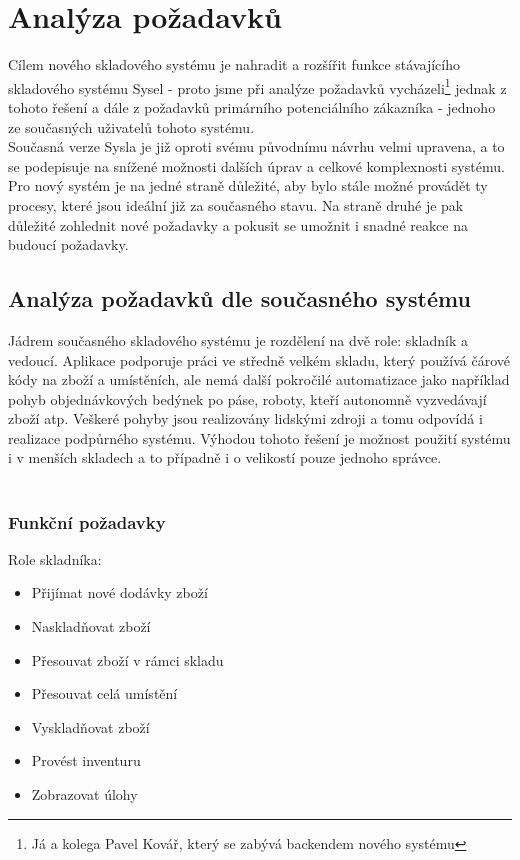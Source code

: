 \chapter{Analýza požadavků}

Cílem nového skladového systému je nahradit a rozšířit funkce stávajícího skladového systému Sysel - proto jsme při analýze požadavků vycházeli\footnote{Já a kolega Pavel Kovář, který se zabývá backendem nového systému} jednak z tohoto řešení a dále z požadavků primárního potenciálního zákazníka - jednoho ze současných uživatelů tohoto systému.\\
Současná verze Sysla je již oproti svému původnímu návrhu velmi upravena, a to se podepisuje na snížené možnosti dalších úprav a celkové komplexnosti systému.\\
Pro nový systém je na jedné straně důležité, aby bylo stále možné provádět ty procesy, které jsou ideální již za současného stavu. Na straně druhé je pak důležité zohlednit nové požadavky a pokusit se umožnit i snadné reakce na budoucí požadavky.

\section{Analýza požadavků dle současného systému}

Jádrem současného skladového systému je rozdělení na dvě role: skladník a vedoucí. Aplikace podporuje práci ve středně velkém skladu, který používá čárové kódy na zboží a umístěních, ale nemá další pokročilé automatizace jako například pohyb objednávkových bedýnek po páse, roboty, kteří autonomně vyzvedávají zboží atp. Veškeré pohyby jsou realizovány lidskými zdroji a tomu odpovídá i realizace podpůrného systému. Výhodou tohoto řešení je možnost použití systému i v menších skladech a to případně i o velikostí pouze jednoho správce.\\
\\
\subsection{Funkční požadavky}

Role skladníka:
\begin{itemize}
	\item Přijímat nové dodávky zboží
	\item Naskladňovat zboží
	\item Přesouvat zboží v rámci skladu
	\item Přesouvat celá umístění
	\item Vyskladňovat zboží
	\item Provést inventuru
	\item Zobrazovat úlohy
\end{itemize}

